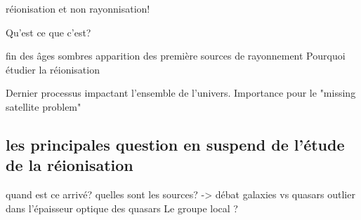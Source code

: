 réionisation et non rayonnisation!

Qu'est ce que c'est?

fin des âges sombres
apparition des première sources de rayonnement
Pourquoi étudier la réionisation

Dernier processus impactant l'ensemble de l'univers.
Importance pour le "missing satellite problem"

\subsection{les principales question en suspend de l'étude de la réionisation}

quand est ce arrivé?
quelles sont les sources? -> débat galaxies vs quasars
outlier dans l'épaisseur optique des quasars
Le groupe local ?


